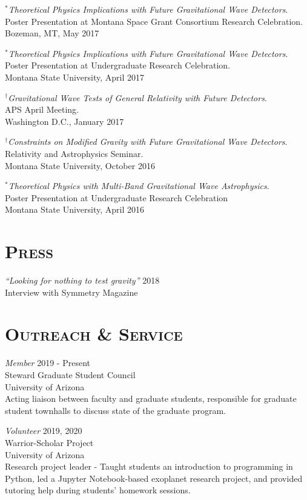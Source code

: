 \documentclass[margin]{res}
\begin{document}
\begin{resume}
\emph{$^{*}$Theoretical Physics Implications with Future Gravitational Wave Detectors}.\\
Poster Presentation at Montana Space Grant Consortium Research Celebration. \\
Bozeman, MT, May 2017

\emph{$^{*}$Theoretical Physics Implications with Future Gravitational Wave Detectors}. \\
Poster Presentation at Undergraduate Research Celebration.\\
Montana State University, April 2017

\emph{${}^{\dagger}$Gravitational Wave Tests of General Relativity with Future Detectors}.\\
APS April Meeting. \\
Washington D.C., January 2017

\emph{${}^{\dagger}$Constraints on Modified Gravity with Future Gravitational Wave Detectors}. \\
Relativity and Astrophysics Seminar. \\
Montana State University, October 2016

\emph{$^{*}$Theoretical Physics with Multi-Band Gravitational Wave Astrophysics}. \\
Poster Presentation at Undergraduate Research Celebration\\  Montana State University, April 2016
\bigskip


\section{\textsc{Press}}
{\sl ``Looking for nothing to test gravity''} \hfill 2018\\
Interview with Symmetry Magazine

\section{\textsc{Outreach \& Service}}
{\sl Member }\hfill 2019 - Present\\
Steward Graduate Student Council\\
University of Arizona\\
{\footnotesize Acting liaison between faculty and graduate students, responsible for graduate student townhalls to discuss state of the graduate program. }

{\sl Volunteer }\hfill 2019, 2020\\
Warrior-Scholar Project\\
University of Arizona\\
{\footnotesize Research project leader - Taught students an introduction to programming in Python, led a Jupyter Notebook-based exoplanet research project, and provided tutoring help during students' homework sessions.}


\end{resume}
\end{document}
